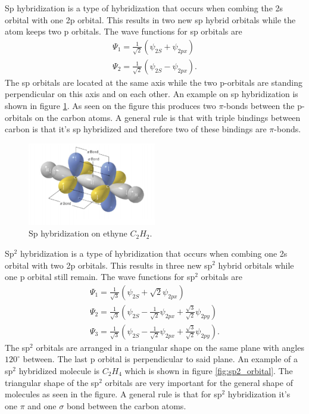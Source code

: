 \documentclass[jmp, amsmath, amssymb, reprint]{article}
\numberwithin{equation}{section}
\newcommand{\lp}{\left(}
\newcommand{\rp}{\right)}
\begin{document}
\begin{multicols}{2}
Sp hybridization is a type of hybridization that occurs when combing the 2s orbital with one 2p orbital. This results in two new sp hybrid orbitals while the atom keeps two p orbitals. The wave functions for sp orbitals are
\begin{align}
\Psi_1 = \frac{1}{\sqrt{2}}\lp \psi_{2S}+\psi_{2px}\rp\\
\Psi_2 = \frac{1}{\sqrt{2}}\lp \psi_{2S}-\psi_{2px}\rp.
\end{align} 
The sp orbitals are located at the same axis while the two p-orbitals are standing perpendicular on this axis and on each other. An example on sp hybridization is shown in figure \ref{fig:sp_orbital}. As seen on the figure this produces two \(\pi\)-bonds between the p-orbitals on the carbon atoms. A general rule is that with triple bindings between carbon is that it's sp hybridized and therefore two of these bindings are \(\pi\)-bonds.

\begin{figure}[H]
	\centering
  	\includegraphics[width=0.50\textwidth]{sp_orbital.png}
	\caption{Sp hybridization on ethyne \(C_2H_2\).}
	\label{fig:sp_orbital}
\end{figure}

Sp\(^2\) hybridization is a type of hybridization that occurs when combing one 2s orbital with two 2p orbitals. This results in three new sp\(^2\) hybrid orbitals while one p orbital still remain. The wave functions for sp\(^2\) orbitals are
\begin{align}
\Psi_1 = \frac{1}{\sqrt{3}}\lp \psi_{2S}+\sqrt{2}\psi_{2px}\rp\\
\Psi_2 = \frac{1}{\sqrt{3}}\lp \psi_{2S} -\frac{1}{\sqrt{2}}\psi_{2px} + \frac{\sqrt{3}}{\sqrt{2}}\psi_{2py}\rp\\
\Psi_3 = \frac{1}{\sqrt{3}}\lp \psi_{2S} -\frac{1}{\sqrt{2}}\psi_{2px} + \frac{\sqrt{3}}{\sqrt{2}}\psi_{2py}\rp.
\end{align}
The sp\(^2\) orbitals are arranged in a triangular shape on the same plane with angles \(120^\circ\) between. The last p orbital is perpendicular to said plane. An example of a sp\(^2\) hybridized molecule is \(C_2H_4\) which is shown in figure \ref{fig:sp2_orbital}. The triangular shape of the sp\(^2\) orbitals are very important for the general shape of molecules as seen in the figure. A general rule is that for sp\(^2\) hybridization it's one \(\pi\) and one \(\sigma\) bond between the carbon atoms.


\end{multicols}
\end{document}
